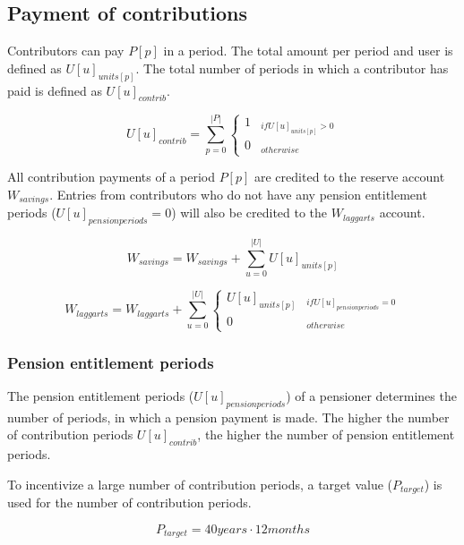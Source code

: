 \subsection{Payment of contributions}

Contributors can pay $P[p]$ in a period. The total amount per period and user is defined as $U[u]_{units[p]}$. The total number of periods in which a contributor has paid is defined as $U[u]_{contrib}$.

\begin{equation}
U[u]_{contrib} = \sum_{p=0}^{|P|} \begin{cases} 
1 & _{if U[u]_{units[p]} > 0} \\
0 & _{otherwise}
\end{cases}
\end{equation}


All contribution payments of a period $P[p]$ are credited to the reserve account $W_{savings}$.
Entries from contributors who do not have any pension entitlement periods ($U[u]_{pensionperiods} = 0$) will also be credited to the $W_{laggarts}$ account.


\begin{equation}
W_{savings} = W_{savings} + \sum_{u=0}^{|U|} U[u]_{units[p]}
\end{equation}


\begin{dmath}
W_{laggarts} = W_{laggarts} + \sum_{u=0}^{|U|} \begin{cases} 
U[u]_{units[p]} & _{if U[u]_{pensionperiods} = 0} \\
0 & _{otherwise}
\end{cases}
\end{dmath}

\subsubsection{Pension entitlement periods}
The pension entitlement periods ($U[u]_{pensionperiods}$) of a pensioner determines the number of periods,
in which a pension payment is made. The higher the number of contribution periods
$U[u]_{contrib}$, the higher the number of pension entitlement periods.

To incentivize a large number of contribution periods, a target value ($P_{target}$) is used
for the number of contribution periods. 

\begin{equation}
	P_{target} = 40 years \cdot 12 months
\end{equation}

